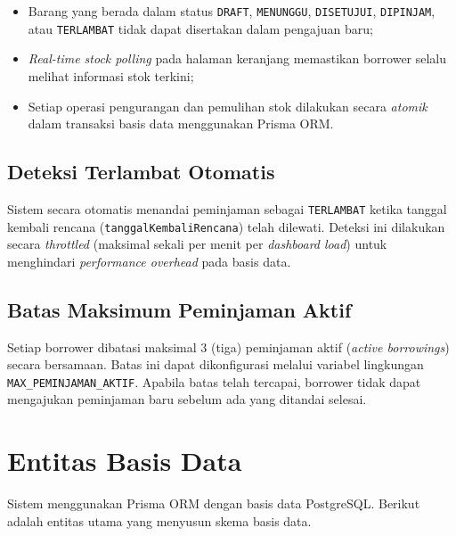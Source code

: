 \documentclass[
  12pt,
  a4paper,
  oneside,
  final
]{report}
\begin{document}
\begin{itemize}
  \item Barang yang berada dalam status \texttt{DRAFT},
        \texttt{MENUNGGU}, \texttt{DISETUJUI}, \texttt{DIPINJAM},
        atau \texttt{TERLAMBAT} tidak dapat disertakan dalam
        pengajuan baru;
  \item {\it Real-time stock polling} pada halaman keranjang
        memastikan borrower selalu melihat informasi stok terkini;
  \item Setiap operasi pengurangan dan pemulihan stok dilakukan
        secara {\it atomik} dalam transaksi basis data
        menggunakan Prisma ORM.
\end{itemize}

\section{Deteksi Terlambat Otomatis}

Sistem secara otomatis menandai peminjaman sebagai \texttt{TERLAMBAT}
ketika tanggal kembali rencana (\texttt{tanggalKembaliRencana})
telah dilewati. Deteksi ini dilakukan secara {\it throttled}
(maksimal sekali per menit per {\it dashboard load}) untuk
menghindari {\it performance overhead} pada basis data.

\section{Batas Maksimum Peminjaman Aktif}

Setiap borrower dibatasi maksimal 3 (tiga) peminjaman aktif
({\it active borrowings}) secara bersamaan. Batas ini
dapat dikonfigurasi melalui variabel lingkungan
\texttt{MAX\_PEMINJAMAN\_AKTIF}. Apabila batas telah tercapai,
borrower tidak dapat mengajukan peminjaman baru sebelum ada
yang ditandai selesai.

\chapter{Entitas Basis Data}


Sistem menggunakan Prisma ORM dengan basis data PostgreSQL.
Berikut adalah entitas utama yang menyusun skema basis data.
\end{document}
